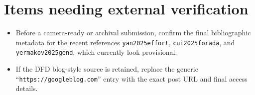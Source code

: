 \documentclass[11pt]{article}
\begin{document}
\section*{Items needing external verification}
\begin{itemize}
    \item Before a camera-ready or archival submission, confirm the final bibliographic metadata for the recent references \texttt{yan2025effort}, \texttt{cui2025forada}, and \texttt{yermakov2025gend}, which currently look provisional.
    \item If the DFD blog-style source is retained, replace the generic ``\texttt{https://googleblog.com}'' entry with the exact post URL and final access details.
\end{itemize}
\end{document}
